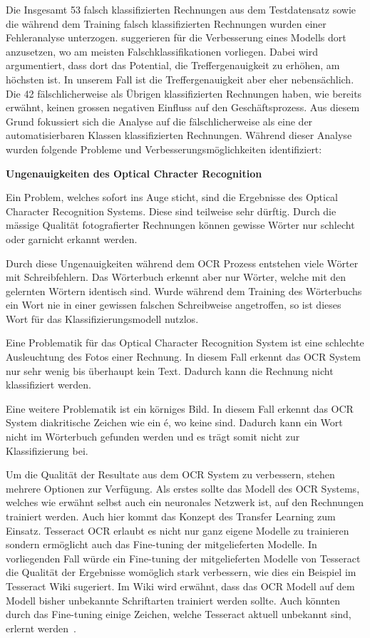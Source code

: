 Die Insgesamt 53 falsch klassifizierten Rechnungen aus dem Testdatensatz sowie die während dem Training falsch klassifizierten Rechnungen wurden einer Fehleranalyse unterzogen. \textcite{MLYearning} suggerieren für die Verbesserung eines Modells dort anzusetzen, wo am meisten Falschklassifikationen vorliegen. Dabei wird argumentiert, dass dort das Potential, die Treffergenauigkeit zu erhöhen, am höchsten ist. In unserem Fall ist die Treffergenauigkeit aber eher nebensächlich. Die 42 fälschlicherweise als Übrigen klassifizierten Rechnungen haben, wie bereits erwähnt, keinen grossen negativen Einfluss auf den Geschäftsprozess. Aus diesem Grund fokussiert sich die Analyse auf die fälschlicherweise als eine der automatisierbaren Klassen klassifizierten Rechnungen. Während dieser Analyse wurden folgende Probleme und Verbesserungsmöglichkeiten identifiziert:

\newpage

{\parindent=0pt
\textbf{Ungenauigkeiten des Optical Chracter Recognition}}

Ein Problem, welches sofort ins Auge sticht, sind die Ergebnisse des Optical Character Recognition Systems. Diese sind teilweise sehr dürftig. Durch die mässige Qualität fotografierter Rechnungen können gewisse Wörter nur schlecht oder garnicht erkannt werden. 

Durch diese Ungenauigkeiten während dem OCR Prozess entstehen viele Wörter mit Schreibfehlern. Das Wörterbuch erkennt aber nur Wörter, welche mit den gelernten Wörtern identisch sind. Wurde während dem Training des Wörterbuchs ein Wort nie in einer gewissen falschen Schreibweise angetroffen, so ist dieses Wort für das Klassifizierungsmodell nutzlos.

Eine Problematik für das Optical Character Recognition System ist eine schlechte Ausleuchtung des Fotos einer Rechnung. In diesem Fall erkennt das OCR System nur sehr wenig bis überhaupt kein Text. Dadurch kann die Rechnung nicht klassifiziert werden.

Eine weitere Problematik ist ein körniges Bild. In diesem Fall erkennt das OCR System diakritische Zeichen wie ein é, wo keine sind. Dadurch kann ein Wort nicht im Wörterbuch gefunden werden und es trägt somit nicht zur Klassifizierung bei.

Um die Qualität der Resultate aus dem OCR System zu verbessern, stehen mehrere Optionen zur Verfügung. Als erstes sollte das Modell des OCR Systems, welches wie erwähnt selbst auch ein neuronales Netzwerk ist, auf den Rechnungen trainiert werden. Auch hier kommt das Konzept des Transfer Learning zum Einsatz. Tesseract OCR erlaubt es nicht nur ganz eigene Modelle zu trainieren sondern ermöglicht auch das Fine-tuning der mitgelieferten Modelle. In vorliegenden Fall würde ein Fine-tuning der mitgelieferten Modelle von Tesseract die Qualität der Ergebnisse womöglich stark verbessern, wie dies ein Beispiel im Tesseract Wiki sugeriert. Im Wiki wird erwähnt, dass das OCR Modell auf dem Modell bisher unbekannte Schriftarten trainiert werden sollte. Auch könnten durch das Fine-tuning einige Zeichen, welche Tesseract aktuell unbekannt sind, erlernt werden~\autocite{TesseractTraining}.

